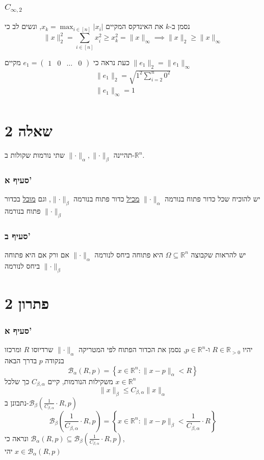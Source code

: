 \documentclass[12pt, titlepage]{article}
\begin{document}
\section*{$C_{\infty,2}$}
נסמן ב-$k$ את האינדקס המקיים $x_k = \max_{i\in\left[n\right]} \left|x_i\right|$, ונשים לב כי
\[
  \lVert x\rVert_2^2 = \sum_{i\in\left[n\right]} x_i^2 \geq  x_k^2 = \lVert x\rVert_\infty \implies \lVert x\rVert_2 \geq \lVert x \rVert_\infty
\]

כעת נראה כי $e_1=\begin{pmatrix}1&0&\ldots&0\end{pmatrix}$ מקיים $\lVert e_1 \rVert_2 = \lVert e_1 \rVert_\infty$
\begin{gather*}
  \lVert e_1 \rVert_2 = \sqrt{1^2 \sum_{i=2}^{n} 0^2} \\
  \lVert e_1 \rVert_\infty = 1 \\
\end{gather*}
\newpage
\part*{שאלה 2}
תהיינה $\lVert \cdot \rVert_\alpha, \lVert \cdot \rVert_\beta$ שתי נורמות שקולות ב-$\mathbb{R}^n$.
\section*{סעיף א'}
יש להוכיח שכל כדור פתוח בנורמה $\lVert\cdot\rVert_\alpha$ \underline{מכיל} כדור פתוח בנורמה $\lVert\cdot\rVert_\beta$, וגם \underline{מוכל} בכדור פתוח בנורמה $\lVert\cdot\rVert_\beta$
\section*{סעיף ב'}
יש להראות שקבוצה $\Omega \subseteq \mathbb{R}^n$ היא פתוחה ביחס לנורמה $\lVert\cdot\rVert_\alpha$ אם ורק אם היא פתוחה ביחס לנורמה $\lVert\cdot\rVert_\beta$
\part*{פתרון 2}
\section*{סעיף א'}
יהיו $R\in\mathbb{R}_{>0}$ ו-$p\in\mathbb{R}^n$, נסמן את הכדור הפתוח לפי המטריקה $\lVert \cdot \rVert_\alpha$ שרדיוסו $R$ ומרכזו בנקודה $p$ בדרך הבאה
\[
  \mathcal{B}_\alpha\left(R,p\right) = \left\{x\in\mathbb{R}^n:\lVert x - p\rVert_\alpha < R\right\}
\]
משקילות הנורמות, קיים $C_{\beta,\alpha}$ כך שלכל $x\in\mathbb{R}^n$
\[
  \lVert x \rVert_\beta \leq C_{\beta,\alpha} \lVert x \rVert_\alpha
\]
נתבונן ב-$\mathcal{B}_\beta\left(\frac{1}{C_{\beta,\alpha}}\cdot R,p\right)$
\[
  \mathcal{B}_\beta\left(\frac{1}{C_{\beta,\alpha}}\cdot R,p\right)= \left\{x\in\mathbb{R}^n : \lVert x-p\rVert_\beta < \frac{1}{C_{\beta,\alpha}} \cdot R\right\}
\]
ונראה כי $\mathcal{B}_\alpha\left(R,p\right)\subseteq\mathcal{B}_\beta\left(\frac{1}{C_{\beta,\alpha}}\cdot R,p\right)$, \\
יהי $x\in \mathcal{B}_\alpha\left(R,p\right)$
\end{document}
